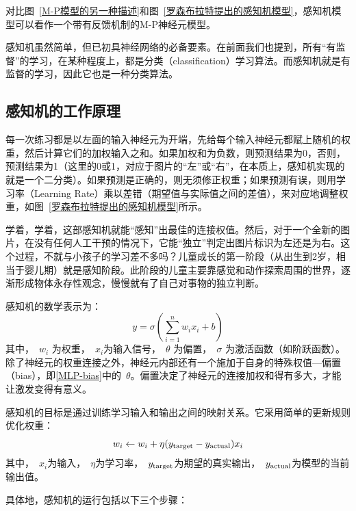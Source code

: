 对比图~\ref{M-P模型的另一种描述}和图~\ref{罗森布拉特提出的感知机模型}，感知机模型可以看作一个带有反馈机制的M-P神经元模型。

感知机虽然简单，但已初具神经网络的必备要素。在前面我们也提到，所有“有监督”的学习，在某种程度上，都是分类（classification）学习算法。而感知机就是有监督的学习，因此它也是一种分类算法。

\subsection{感知机的工作原理}

每一次练习都是以左面的输入神经元为开端，先给每个输入神经元都赋上随机的权重，然后计算它们的加权输入之和。如果加权和为负数，则预测结果为0，否则，预测结果为1（这里的0或1，对应于图片的“左”或“右”，在本质上，感知机实现的就是一个二分类）。如果预测是正确的，则无须修正权重；如果预测有误，则用学习率（Learning Rate）乘以差错（期望值与实际值之间的差值），来对应地调整权重，如图~\ref{罗森布拉特提出的感知机模型}所示。

学着，学着，这部感知机就能“感知”出最佳的连接权值。然后，对于一个全新的图片，在没有任何人工干预的情况下，它能“独立”判定出图片标识为左还是为右。这个过程，不就与小孩子的学习差不多吗？儿童成长的第一阶段（从出生到2岁，相当于婴儿期）就是感知阶段。此阶段的儿童主要靠感觉和动作探索周围的世界，逐渐形成物体永存性观念，慢慢就有了自己对事物的独立判断。

感知机的数学表示为：
\begin{equation}\label{MLP-bias}
y = \sigma \left( \sum_{i=1}^n w_i x_i +b\right)
\end{equation}
其中，~$w_i$ 为权重，~$x_i$为输入信号，~$\theta$ 为偏置，~$\sigma$ 为激活函数（如阶跃函数）。
除了神经元的权重连接之外，神经元内部还有一个施加于自身的特殊权值---偏置（bias），即\eqref{MLP-bias}中的~$\theta$。偏置决定了神经元的连接加权和得有多大，才能让激发变得有意义。

感知机的目标是通过训练学习输入和输出之间的映射关系。它采用简单的更新规则优化权重：
 $$ w_i \leftarrow w_i+ \eta ( y_{\rm target}- y_{\rm actual}) x_i$$
 其中，~$x_i$为输入，~$\eta$为学习率，~$ y_{\rm target}$为期望的真实输出，~$ y_{\rm actual}$为模型的当前输出值。 

具体地，感知机的运行包括以下三个步骤：

